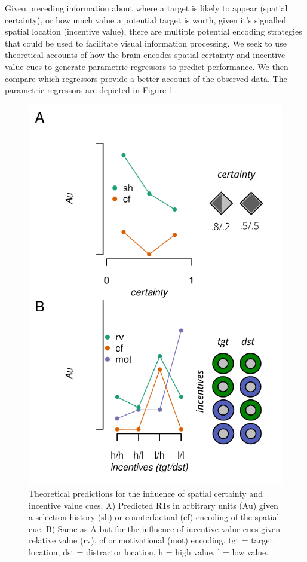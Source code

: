 \documentclass[11pt,halfline,a4paper,]{ouparticle}
\begin{document}
\label{sec:Theory}

Given preceding information about where a target is likely to appear (spatial certainty), or how much value a potential target is worth, given it's signalled spatial location (incentive value), there are multiple potential encoding strategies that could be used to facilitate visual information processing. We seek to use theoretical accounts of how the brain encodes spatial certainty and incentive value cues to generate parametric regressors to predict performance. We then compare which regressors provide a better account of the observed data. The parametric regressors are depicted in Figure \ref{fig:predres}.

\begin{figure}[p]

{\centering \includegraphics[width=1\linewidth]{../images/doc-theoret-pred} 

}

\caption{Theoretical predictions for the influence of spatial certainty and incentive value cues. A) Predicted RTs in arbitrary units (Au) given a selection-history (sh) or counterfactual (cf) encoding of the spatial cue. B) Same as A but for the influence of incentive value cues given relative value (rv), cf or motivational (mot) encoding. tgt = target location, dst = distractor location, h = high value, l = low value.}\label{fig:predres}
\end{figure}
\end{document}

